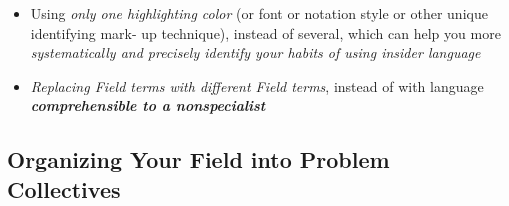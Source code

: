\documentclass[11pt]{article}
\begin{document}
\begin{itemize}
\begin{itemize}
\item Using \emph{only one highlighting color} (or font or notation style or other unique identifying mark- up technique), instead of several, which can help you more \emph{systematically and precisely identify your habits of using insider language}

\item \emph{Replacing Field terms with different Field terms}, instead of with language \emph{\textbf{comprehensible to a nonspecialist}}
\end{itemize}

\end{itemize}
\subsection{Organizing Your Field into Problem Collectives}
\end{document}
